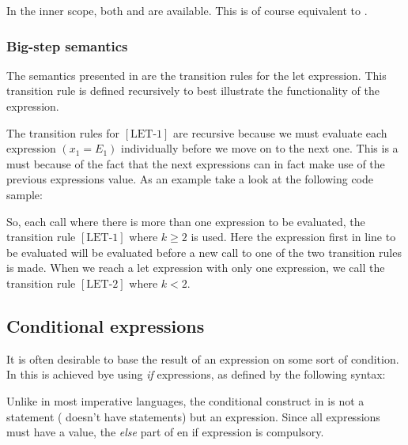 In the inner scope, both  and  are available. This is of
course equivalent to .


\subsubsection{Big-step semantics}

The semantics presented in  are the transition rules for
the let expression. This transition rule is defined recursively to best
illustrate the functionality of the expression.



The transition rules for $[\mbox{LET-1}]$ are recursive because we must
evaluate each expression $(x_{1}=E_{1})$ individually before we move on to the next one. This
is a must because of the fact that the next expressions can in fact make use of
the previous expressions value. As an example take a look at the following code
sample:


So, each call where there is more than one expression to be evaluated, 
the transition rule $[\mbox{LET-1}]$ where $k \geq 2$ is used. Here the expression first
in line to be evaluated will be evaluated before a new call to one of the two
transition rules is made. When we reach a let expression with only one
expression, we call the transition rule $[\mbox{LET-2}]$ where $k < 2$.

\subsection{Conditional expressions}
\label{sec:conditionalexpressions}

It is often desirable to base the result of an expression on some sort of condition.
In \productname{} this is achieved bye using \emph{if} expressions, as defined by the
following syntax:

\begin{ebnf}
\end{ebnf}

Unlike in most imperative languages, the conditional construct in \productname{}
is not a statement (\productname{} doesn't have statements) but an expression.
Since all expressions must have a value, the \emph{else} part of en
if expression is compulsory.

